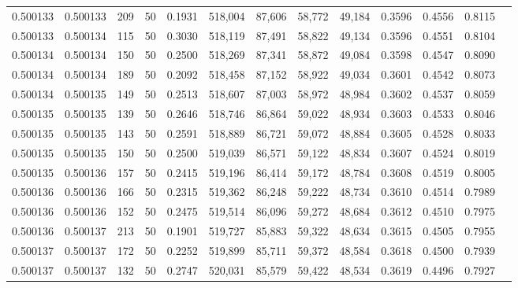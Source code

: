 \begin{tabular}{rrrrrrrrrrrrr}
0.500133 & 0.500133 &   209 &  50 &                                     0.1931 & 518,004 &  87,606 &  58,772 &  49,184 & 0.3596 & 0.4556 & 0.8115 \\
0.500133 & 0.500134 &   115 &  50 &                                     0.3030 & 518,119 &  87,491 &  58,822 &  49,134 & 0.3596 & 0.4551 & 0.8104 \\
0.500134 & 0.500134 &   150 &  50 &                                     0.2500 & 518,269 &  87,341 &  58,872 &  49,084 & 0.3598 & 0.4547 & 0.8090 \\
0.500134 & 0.500134 &   189 &  50 &                                     0.2092 & 518,458 &  87,152 &  58,922 &  49,034 & 0.3601 & 0.4542 & 0.8073 \\
0.500134 & 0.500135 &   149 &  50 &                                     0.2513 & 518,607 &  87,003 &  58,972 &  48,984 & 0.3602 & 0.4537 & 0.8059 \\
0.500135 & 0.500135 &   139 &  50 &                                     0.2646 & 518,746 &  86,864 &  59,022 &  48,934 & 0.3603 & 0.4533 & 0.8046 \\
0.500135 & 0.500135 &   143 &  50 &                                     0.2591 & 518,889 &  86,721 &  59,072 &  48,884 & 0.3605 & 0.4528 & 0.8033 \\
0.500135 & 0.500135 &   150 &  50 &                                     0.2500 & 519,039 &  86,571 &  59,122 &  48,834 & 0.3607 & 0.4524 & 0.8019 \\
0.500135 & 0.500136 &   157 &  50 &                                     0.2415 & 519,196 &  86,414 &  59,172 &  48,784 & 0.3608 & 0.4519 & 0.8005 \\
0.500136 & 0.500136 &   166 &  50 &                                     0.2315 & 519,362 &  86,248 &  59,222 &  48,734 & 0.3610 & 0.4514 & 0.7989 \\
0.500136 & 0.500136 &   152 &  50 &                                     0.2475 & 519,514 &  86,096 &  59,272 &  48,684 & 0.3612 & 0.4510 & 0.7975 \\
0.500136 & 0.500137 &   213 &  50 &                                     0.1901 & 519,727 &  85,883 &  59,322 &  48,634 & 0.3615 & 0.4505 & 0.7955 \\
0.500137 & 0.500137 &   172 &  50 &                                     0.2252 & 519,899 &  85,711 &  59,372 &  48,584 & 0.3618 & 0.4500 & 0.7939 \\
0.500137 & 0.500137 &   132 &  50 &                                     0.2747 & 520,031 &  85,579 &  59,422 &  48,534 & 0.3619 & 0.4496 & 0.7927 \\

\end{tabular}
